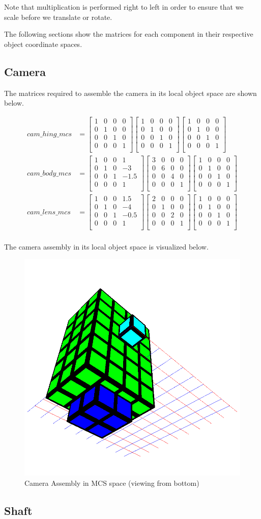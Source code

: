 \documentclass[12pt]{article}
\newcommand{\scale}[3]{
    \begin{bmatrix}
        #1 & 0 & 0 & 0 \\
        0 & #2 & 0 & 0 \\
        0 & 0 & #3 & 0 \\
        0 & 0 & 0 & 1 \\
    \end{bmatrix}
}
\newcommand{\identity}{
    \begin{bmatrix}
        1 & 0 & 0 & 0 \\
        0 & 1 & 0 & 0 \\
        0 & 0 & 1 & 0 \\
        0 & 0 & 0 & 1 \\
    \end{bmatrix}
}
\newcommand{\trans}[3]{
    \begin{bmatrix}
        1 & 0 & 0 & #1 \\
        0 & 1 & 0 & #2 \\
        0 & 0 & 1 & #3 \\
        0 & 0 & 0 & 1 \\
    \end{bmatrix}
}
\newcommand{\mattext}[1]{
    The matrices required to assemble the #1 in its local object space are shown below.
}
\newcommand{\imgtext}[1]{
    The #1 assembly in its local object space is visualized below.
}
\begin{document}
    Note that multiplication is performed right to left in order to ensure that
    we scale before we translate or rotate.

    \vspace{\baselineskip}
    The following sections show the matrices for each component in their
    respective object coordinate spaces.

    \newpage
    \subsection*{Camera}

        \mattext{camera}
        $$
        \begin{aligned}
            cam\_hing\_mcs &= \trans{0}{0}{0} \scale{1}{1}{1} \identity \\
            cam\_body\_mcs &= \trans{1}{-3}{-1.5} \scale{3}{6}{4} \identity \\
            cam\_lens\_mcs &= \trans{1.5}{-4}{-0.5} \scale{2}{1}{2} \identity \\
        \end{aligned}
        $$

        \imgtext{camera}
        \begin{figure}[H]
            \centering
            \includegraphics[width=0.75\linewidth]{../images/camera.png}
            \caption{Camera Assembly in MCS space (viewing from bottom)}
        \end{figure}

    \newpage
    \subsection*{Shaft}
\end{document}
